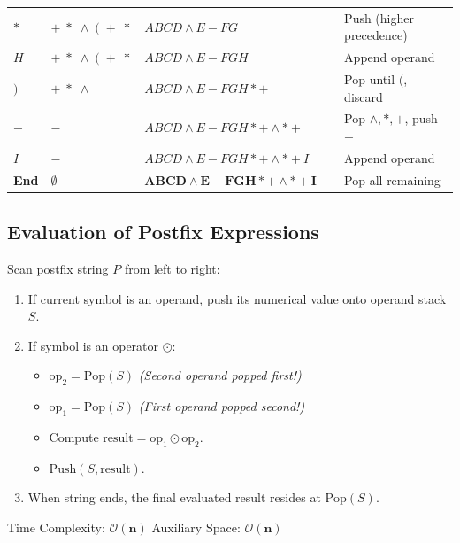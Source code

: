 \documentclass[12pt,a4paper]{article}
\begin{document}
\begin{longtable}{|B{1.6cm}|B{2.8cm}|>{\small\raggedright\arraybackslash}m{\dimexpr(\linewidth-1.6cm-2.8cm-3.2cm-8\arrayrulewidth)/1\relax}|B{3.2cm}|}
$*$ & $+ \; * \; \wedge \; ( \; + \; *$ & $A B C D \wedge E - F G$ & Push (higher precedence) \\
$H$ & $+ \; * \; \wedge \; ( \; + \; *$ & $A B C D \wedge E - F G H$ & Append operand \\
$)$ & $+ \; * \; \wedge$ & $A B C D \wedge E - F G H * +$ & Pop until $($, discard \\
$-$ & $-$ & $A B C D \wedge E - F G H * + \wedge * +$ & Pop $\wedge, *, +$, push $-$ \\
$I$ & $-$ & $A B C D \wedge E - F G H * + \wedge * + I$ & Append operand \\
\textbf{End} & $\emptyset$ & $\mathbf{A B C D \wedge E - F G H * + \wedge * + I -}$ & Pop all remaining \\
\hline
\end{longtable}
\endgroup
\endgroup


\subsection{Evaluation of Postfix Expressions}
\begin{tcolorbox}[formulabox, title={\textbf{Postfix Expression Evaluation Algorithm}}]
Scan postfix string $P$ from left to right:
\begin{enumerate}[leftmargin=*, nosep]
  \item If current symbol is an operand, push its numerical value onto operand stack $S$.
  \item If symbol is an operator $\odot$:
  \begin{itemize}[leftmargin=*, nosep]
    \item $\text{op}_2 = \text{Pop}(S)$ \quad \textit{(Second operand popped first!)}
    \item $\text{op}_1 = \text{Pop}(S)$ \quad \textit{(First operand popped second!)}
    \item Compute $\text{result} = \text{op}_1 \odot \text{op}_2$.
    \item $\text{Push}(S, \text{result})$.
  \end{itemize}
  \item When string ends, the final evaluated result resides at $\text{Pop}(S)$.
\end{enumerate}
Time Complexity: $\mathbf{\mathcal{O}(n)}$ \quad Auxiliary Space: $\mathbf{\mathcal{O}(n)}$
\end{tcolorbox}
\end{document}
